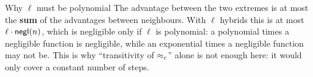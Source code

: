 \begin{framedobs}{Why $\ell$ must be polynomial}
  The advantage between the two extremes is at most the \textbf{sum} of the advantages between neighbours. With $\ell$ hybrids this is at most $\ell \cdot \mathsf{negl}(n)$, which is negligible only if $\ell$ is polynomial: a polynomial times a negligible function is negligible, while an exponential times a negligible function may not be. This is why ``transitivity of $\approx_c$'' alone is not enough here: it would only cover a constant number of steps.
\end{framedobs}

